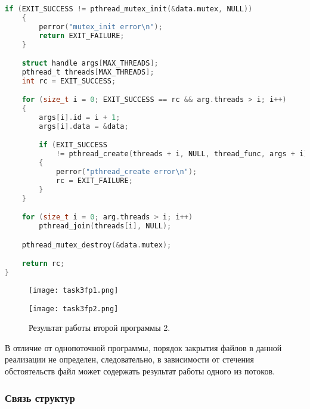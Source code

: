 \begin{lstlisting}[language=c, caption={Вторая программа 2 (многопоточный вариант)}]
    if (EXIT_SUCCESS != pthread_mutex_init(&data.mutex, NULL))
    {
        perror("mutex_init error\n");
        return EXIT_FAILURE;
    }

    struct handle args[MAX_THREADS];
    pthread_t threads[MAX_THREADS];
    int rc = EXIT_SUCCESS;

    for (size_t i = 0; EXIT_SUCCESS == rc && arg.threads > i; i++)
    {
        args[i].id = i + 1;
        args[i].data = &data;

        if (EXIT_SUCCESS
            != pthread_create(threads + i, NULL, thread_func, args + i))
        {
            perror("pthread_create error\n");
            rc = EXIT_FAILURE;
        }
    }

    for (size_t i = 0; arg.threads > i; i++)
        pthread_join(threads[i], NULL);

    pthread_mutex_destroy(&data.mutex);

    return rc;
}
\end{lstlisting}

\begin{figure}[h]
    \centering
    \hspace*{\fill}
    \begin{minipage}{0.49\textwidth}
        \centering
        \texttt{[image: task3fp1.png]}
    \end{minipage}
    \hfill
    \begin{minipage}{0.48\textwidth}
        \centering
        \texttt{[image: task3fp2.png]}
    \end{minipage}
    \hspace*{\fill}
    \caption{Результат работы второй программы 2.}
\end{figure}

В отличие от однопоточной программы, порядок закрытия файлов в данной реализации
не определен, следовательно, в зависимости от стечения обстоятельств файл
может содержать результат работы одного из потоков.

\subsubsection{Связь структур}

\vspace*{\fill}
\begin{figure}[h]
    \centering
    \def\svgwidth{\textwidth}
    
\end{figure}
\vfill

